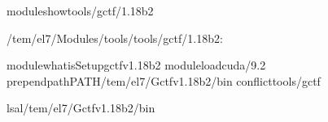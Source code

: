 \documentclass[a4paper,11pt,english]{sphinxmanual}
\begin{document}
\begin{sphinxVerbatim}[commandchars=\\\{\}]
\PYGZdl{}\PYGZgt{}moduleshowtools/gctf/1.18\PYGZus{}b2

\PYGZhy{}\PYGZhy{}\PYGZhy{}\PYGZhy{}\PYGZhy{}\PYGZhy{}\PYGZhy{}\PYGZhy{}\PYGZhy{}\PYGZhy{}\PYGZhy{}\PYGZhy{}\PYGZhy{}\PYGZhy{}\PYGZhy{}\PYGZhy{}\PYGZhy{}\PYGZhy{}\PYGZhy{}\PYGZhy{}\PYGZhy{}\PYGZhy{}\PYGZhy{}\PYGZhy{}\PYGZhy{}\PYGZhy{}\PYGZhy{}\PYGZhy{}\PYGZhy{}\PYGZhy{}\PYGZhy{}\PYGZhy{}\PYGZhy{}\PYGZhy{}\PYGZhy{}\PYGZhy{}\PYGZhy{}\PYGZhy{}\PYGZhy{}\PYGZhy{}\PYGZhy{}\PYGZhy{}\PYGZhy{}\PYGZhy{}\PYGZhy{}\PYGZhy{}\PYGZhy{}\PYGZhy{}\PYGZhy{}\PYGZhy{}\PYGZhy{}\PYGZhy{}\PYGZhy{}\PYGZhy{}\PYGZhy{}\PYGZhy{}\PYGZhy{}\PYGZhy{}\PYGZhy{}\PYGZhy{}\PYGZhy{}\PYGZhy{}\PYGZhy{}\PYGZhy{}\PYGZhy{}\PYGZhy{}\PYGZhy{}
/tem/el7/Modules/tools/tools/gctf/1.18\PYGZus{}b2:

module\PYGZhy{}whatisSetupgctfv1.18\PYGZus{}b2
moduleloadcuda/9.2
prepend\PYGZhy{}pathPATH/tem/el7/Gctf\PYGZus{}v1.18\PYGZus{}b2/bin
conflicttools/gctf
\PYGZhy{}\PYGZhy{}\PYGZhy{}\PYGZhy{}\PYGZhy{}\PYGZhy{}\PYGZhy{}\PYGZhy{}\PYGZhy{}\PYGZhy{}\PYGZhy{}\PYGZhy{}\PYGZhy{}\PYGZhy{}\PYGZhy{}\PYGZhy{}\PYGZhy{}\PYGZhy{}\PYGZhy{}\PYGZhy{}\PYGZhy{}\PYGZhy{}\PYGZhy{}\PYGZhy{}\PYGZhy{}\PYGZhy{}\PYGZhy{}\PYGZhy{}\PYGZhy{}\PYGZhy{}\PYGZhy{}\PYGZhy{}\PYGZhy{}\PYGZhy{}\PYGZhy{}\PYGZhy{}\PYGZhy{}\PYGZhy{}\PYGZhy{}\PYGZhy{}\PYGZhy{}\PYGZhy{}\PYGZhy{}\PYGZhy{}\PYGZhy{}\PYGZhy{}\PYGZhy{}\PYGZhy{}\PYGZhy{}\PYGZhy{}\PYGZhy{}\PYGZhy{}\PYGZhy{}\PYGZhy{}\PYGZhy{}\PYGZhy{}\PYGZhy{}\PYGZhy{}\PYGZhy{}\PYGZhy{}\PYGZhy{}\PYGZhy{}\PYGZhy{}\PYGZhy{}\PYGZhy{}\PYGZhy{}\PYGZhy{}


\PYGZdl{}\PYGZgt{}ls\PYGZhy{}al/tem/el7/Gctf\PYGZus{}v1.18\PYGZus{}b2/bin


\end{sphinxVerbatim}
\end{document}
